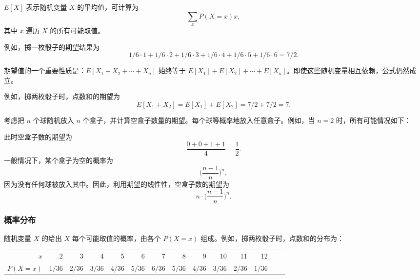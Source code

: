 
 $E[X]$ 表示随机变量 $X$ 的平均值，可计算为
\[\sum_x P(X=x)x,\]
其中 $x$ 遍历 $X$ 的所有可能取值。

例如，掷一枚骰子的期望结果为
\[1/6 \cdot 1 + 1/6 \cdot 2 + 1/6 \cdot 3 + 1/6 \cdot 4 + 1/6 \cdot 5 + 1/6 \cdot 6 = 7/2.\]

期望值的一个重要性质是：$E[X_1+X_2+\cdots+X_n]$ 始终等于 $E[X_1]+E[X_2]+\cdots+E[X_n]$。即使这些随机变量相互依赖，公式仍然成立。

例如，掷两枚骰子时，点数和的期望为
\[E[X_1+X_2]=E[X_1]+E[X_2]=7/2+7/2=7.\]

考虑把 $n$ 个球随机放入 $n$ 个盒子，并计算空盒子数量的期望。每个球等概率地放入任意盒子。例如，当 $n=2$ 时，所有可能情况如下：
\begin{center}
\end{center}
此时空盒子数的期望为
\[\frac{0+0+1+1}{4} = \frac{1}{2}.\]
一般情况下，某个盒子为空的概率为
\[\Big(\frac{n-1}{n}\Big)^n,\]
因为没有任何球被放入其中。因此，利用期望的线性性，空盒子数的期望为
\[n \cdot \Big(\frac{n-1}{n}\Big)^n.\]

\subsubsection{概率分布}


随机变量 $X$ 的给出 $X$ 每个可能取值的概率，由各个 $P(X=x)$ 组成。例如，掷两枚骰子时，点数和的分布为：
\begin{center}
\small {
\begin{tabular}{r|rrrrrrrrrrrrr}
$x$ & 2 & 3 & 4 & 5 & 6 & 7 & 8 & 9 & 10 & 11 & 12 \\
$P(X=x)$ & $1/36$ & $2/36$ & $3/36$ & $4/36$ & $5/36$ & $6/36$ & $5/36$ & $4/36$ & $3/36$ & $2/36$ & $1/36$ \\
\end{tabular}
}
\end{center}

